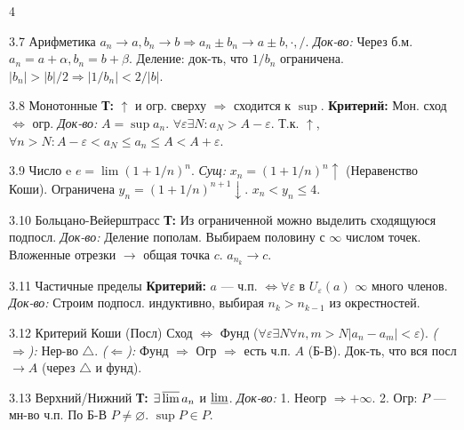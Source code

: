 \documentclass[8pt, a4paper, landscape]{extarticle}
\newcommand{\Ra}{\Rightarrow}
\newcommand{\eps}{\varepsilon}
\begin{document}
\begin{multicols*}{4}
\begin{ticket}{3.7 Арифметика}
$a_n \to a, b_n \to b \Ra a_n \pm b_n \to a \pm b, \cdot, /$.
\tcblower
\textit{Док-во:} Через б.м. $a_n = a+\alpha, b_n = b+\beta$.
Деление: док-ть, что $1/b_n$ ограничена.
$|b_n| > |b|/2 \Ra |1/b_n| < 2/|b|$.
\end{ticket}

\begin{ticket}{3.8 Монотонные}
\textbf{Т:} $\uparrow$ и огр. сверху $\Ra$ сходится к $\sup$.
\textbf{Критерий:} Мон. сход $\iff$ огр.
\tcblower
\textit{Док-во:} $A = \sup a_n$. $\forall \eps \exists N: a_N > A-\eps$.
Т.к. $\uparrow$, $\forall n>N: A-\eps < a_N \le a_n \le A < A+\eps$.
\end{ticket}

\begin{ticket}{3.9 Число e}
$e = \lim (1+1/n)^n$.
\tcblower
\textit{Сущ:} $x_n=(1+1/n)^n \uparrow$ (Неравенство Коши).
Ограничена $y_n=(1+1/n)^{n+1} \downarrow$. $x_n < y_n \le 4$.
\end{ticket}

\begin{ticket}{3.10 Больцано-Вейерштрасс}
\textbf{Т:} Из ограниченной можно выделить сходящуюся подпосл.
\tcblower
\textit{Док-во:} Деление пополам. Выбираем половину с $\infty$ числом точек.
Вложенные отрезки $\to$ общая точка $c$. $a_{n_k} \to c$.
\end{ticket}

\begin{ticket}{3.11 Частичные пределы}
\textbf{Критерий:} $a$ — ч.п. $\iff \forall \eps$ в $U_\eps(a)$ $\infty$ много членов.
\tcblower
\textit{Док-во:} Строим подпосл. индуктивно, выбирая $n_k > n_{k-1}$ из окрестностей.
\end{ticket}

\begin{ticket}{3.12 Критерий Коши (Посл)}
Сход $\iff$ Фунд ($\forall \eps \exists N \forall n,m>N |a_n-a_m|<\eps$).
\tcblower
\textit{($\Ra$):} Нер-во $\triangle$.
\textit{($\Leftarrow$):} Фунд $\Ra$ Огр $\Ra$ есть ч.п. $A$ (Б-В).
Док-ть, что вся посл $\to A$ (через $\triangle$ и фунд).
\end{ticket}

\begin{ticket}{3.13 Верхний/Нижний}
\textbf{Т:} $\exists \varlimsup a_n$ и $\varliminf$.
\tcblower
\textit{Док-во:} 1. Неогр $\Ra +\infty$.
2. Огр: $P$ — мн-во ч.п. По Б-В $P \ne \varnothing$. $\sup P \in P$.
\end{ticket}


\end{multicols*}
\end{document}
